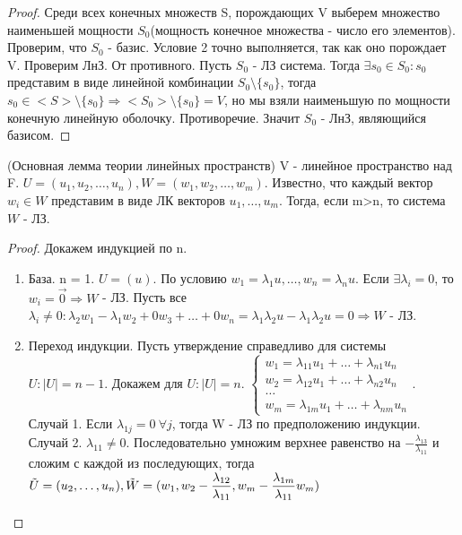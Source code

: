 \begin{proof}
	Среди всех конечных множеств S, порождающих V выберем множество наименьшей мощности \(S_0\)(мощность конечное множества - число его элементов). Проверим, что \(S_0\) - базис. 
	Условие 2 точно выполняется, так как оно порождает V. Проверим ЛнЗ. От противного. Пусть \(S_0\) - ЛЗ система.
	 Тогда \(\exists s_0\in S_0: s_0\) представим в виде линейной комбинации \(S_0\setminus\{s_0\}\), 
	 тогда \(s_0\in<S>\setminus\{s_0\}\Longrightarrow <S_0>\setminus\{s_0\}=V\), но мы взяли наименьшую по мощности конечную линейную оболочку. 
	 Противоречие. Значит \(S_0\) - ЛнЗ, являющийся базисом.
\end{proof}
\begin{lemma}
	(Основная лемма теории линейных пространств) \newline
	V - линейное пространство над F. \(U = (u_1, u_2,\ldots, u_n), W = (w_1, w_2,\ldots, w_m).\) Известно, что каждый вектор \(w_i\in W\) представим в виде ЛК векторов \(u_1, \ldots, u_m\). Тогда, если m>n, то система \(W\) - ЛЗ.
\end{lemma}
\begin{proof}
	Докажем индукцией по n. 
	\begin{enumerate}
		\item База. n = 1. \(U = (u)\). По условию \(w_1 = \lambda_1u, \ldots, w_n = \lambda_nu\). Если \(\exists \lambda_i = 0\), то \(w_i = \vec 0\Longrightarrow W\) - ЛЗ. 
		Пусть все \(\lambda_i\ne0: \lambda_2w_1-\lambda_1w_2 + 0w_3 + \ldots + 0w_n = \lambda_1\lambda_2u - \lambda_1\lambda_2u = 0\Longrightarrow W\) - ЛЗ.
		\item Переход индукции. Пусть утверждение справедливо для системы  \(U: |U| = n -1\). Докажем для \(U: |U| = n\). \(\left\{\begin{gathered}
			w_1 = \lambda_{11}u_1 + \ldots + \lambda_{n1}u_n \\
			w_2 = \lambda_{12}u_1 + \ldots + \lambda_{n2}u_n \\
			\ldots \\
			w_m = \lambda_{1m}u_1 + \ldots + \lambda_{nm}u_n
		\end{gathered}\right.\). \newline
		Случай 1. Если \(\lambda_{1j} = 0 \: \forall j\), тогда W - ЛЗ по предположению индукции. \newline
		Случай 2. \(\lambda_{11}\ne 0\). Последовательно умножим верхнее равенство на \(-\frac{\lambda_{13}}{\lambda_{11}}\) и сложим с каждой из последующих, 
		тогда \(\Tilde U = (u_2, \ldots, u_n), \Tilde W = (w_1, w_2 - \dfrac{\lambda_{12}}{\lambda_{11}}, w_m - \dfrac{\lambda_{1m}}{\lambda_{11}}w_m)\)
	\end{enumerate}
\end{proof}















